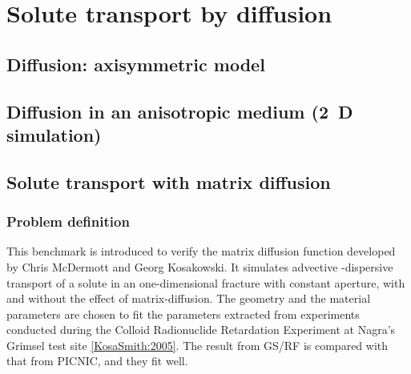 


%

\section{Solute transport by diffusion}



\subsection{Diffusion: axisymmetric model}



\subsection{Diffusion in an anisotropic medium (2~D simulation)}



\subsection{Solute transport with matrix diffusion}
\subsubsection*{Problem definition}
This benchmark is introduced to verify the matrix diffusion function
developed by Chris McDermott and Georg Kosakowski. It simulates
advective -dispersive transport of a solute in an one-dimensional
fracture with constant aperture, with and without the effect of
matrix-diffusion. The geometry and the material parameters are
chosen to fit the parameters extracted from experiments conducted
during the Colloid Radionuclide Retardation Experiment at Nagra's
Grimsel test site \ref{KosaSmith:2005}. The result from GS/RF is
compared with that from PICNIC, and they fit well.

